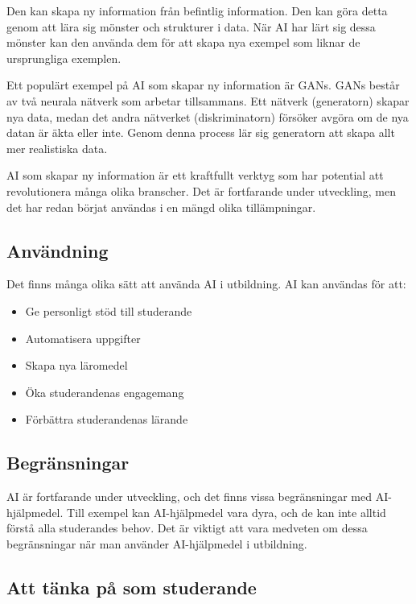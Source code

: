 Den kan skapa ny information från befintlig information. Den kan göra
detta genom att lära sig mönster och strukturer i data. När AI har lärt
sig dessa mönster kan den använda dem för att skapa nya exempel som
liknar de ursprungliga exemplen.

Ett populärt exempel på AI som skapar ny information är GANs. GANs
består av två neurala nätverk som arbetar tillsammans. Ett nätverk
(generatorn) skapar nya data, medan det andra nätverket (diskriminatorn)
försöker avgöra om de nya datan är äkta eller inte. Genom denna process
lär sig generatorn att skapa allt mer realistiska data.

AI som skapar ny information är ett kraftfullt verktyg som har potential
att revolutionera många olika branscher. Det är fortfarande under
utveckling, men det har redan börjat användas i en mängd olika
tillämpningar.

\hypertarget{anvuxe4ndning}{%
\subsection{Användning}\label{anvuxe4ndning}}

Det finns många olika sätt att använda AI i utbildning. AI kan användas
för att:

\begin{itemize}
\tightlist
\item
  Ge personligt stöd till studerande
\item
  Automatisera uppgifter
\item
  Skapa nya läromedel
\item
  Öka studerandenas engagemang
\item
  Förbättra studerandenas lärande
\end{itemize}

\hypertarget{begruxe4nsningar}{%
\subsection{Begränsningar}\label{begruxe4nsningar}}

AI är fortfarande under utveckling, och det finns vissa begränsningar
med AI-hjälpmedel. Till exempel kan AI-hjälpmedel vara dyra, och de kan
inte alltid förstå alla studerandes behov. Det är viktigt att vara
medveten om dessa begränsningar när man använder AI-hjälpmedel i
utbildning.

\hypertarget{att-tuxe4nka-puxe5-som-studerande}{%
\subsection{Att tänka på som
studerande}\label{att-tuxe4nka-puxe5-som-studerande}}


